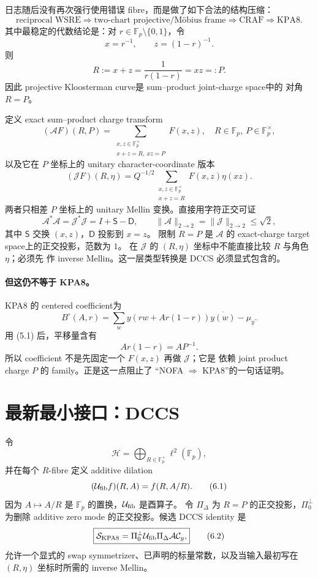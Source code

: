 \documentclass[11pt,a4paper]{ctexart}
\theoremstyle{definition}
\newcommand{\F}{\mathbb F}
\newcommand{\G}{\F_p^\times}
\begin{document}
日志随后没有再次强行使用错误 fibre，而是做了如下合法的结构压缩：
\[
\text{reciprocal WSRE}
\Longrightarrow \text{two-chart projective/M\"obius frame}
\Longrightarrow \mathrm{CRAF}
\Longrightarrow \mathrm{KPA8}.
\]
其中最稳定的代数结论是：对 $r\in\F_p\setminus\{0,1\}$，令
\[
x=r^{-1},\qquad z=(1-r)^{-1}.
\]
则
\[
R:=x+z=\frac1{r(1-r)}=xz=:P.
\tag{5.1}
\]
因此 projective Kloosterman curve是 sum--product joint-charge space中的
对角 $R=P$。

定义 exact sum--product charge transform
\[
(\mathcal AF)(R,P)
=\sum_{\substack{x,z\in\G\\x+z=R,\ xz=P}}F(x,z),
\quad R\in\F_p,\ P\in\G,
\tag{5.2}
\]
以及它在 $P$ 坐标上的 unitary character-coordinate 版本
\[
(\mathcal JF)(R,\eta)
=Q^{-1/2}\sum_{\substack{x,z\in\G\\x+z=R}}
F(x,z)\eta(xz).
\tag{5.3}
\]
两者只相差 $P$ 坐标上的 unitary Mellin 变换。直接用字符正交可证
\[
\boxed{\mathcal A^*\mathcal A
=\mathcal J^*\mathcal J=I+\mathsf S-\mathsf D},
\qquad \|\mathcal A\|_{2\to2}=\|\mathcal J\|_{2\to2}\le\sqrt2,
\tag{5.4}
\]
其中 $\mathsf S$ 交换 $(x,z)$，$\mathsf D$ 投影到 $x=z$。
限制 $R=P$ 是 $\mathcal A$ 的 exact-charge target space上的正交投影，范数为 $1$。
在 $\mathcal J$ 的 $(R,\eta)$ 坐标中不能直接比较 $R$ 与角色 $\eta$；必须先
作 inverse Mellin。这一层类型转换是 DCCS 必须显式包含的。

\paragraph{但这仍不等于 KPA8。}
KPA8 的 centered coefficient为
\[
B^\circ(A,r)
=\sum_w y(rw+Ar(1-r))\overline{y(w)}-\mu_y.
\tag{5.5}
\]
用 (5.1) 后，平移量含有
\[
Ar(1-r)=AP^{-1}.
\tag{5.6}
\]
所以 coefficient 不是先固定一个 $F(x,z)$ 再做 $\mathcal J$；它是
依赖 joint product charge $P$ 的 family。正是这一点阻止了
“NOFA $\Rightarrow$ KPA8”的一句话证明。

\section{最新最小接口：DCCS}

令
\[
\mathscr H=\bigoplus_{R\in\G}\ell^2(\F_p),
\]
并在每个 $R$-fibre 定义 additive dilation
\[
(\mathcal U_{\rm fib}f)(R,A)=f(R,A/R).
\tag{6.1}
\]
因为 $A\mapsto A/R$ 是 $\F_p$ 的置换，$\mathcal U_{\rm fib}$ 是酉算子。
令 $\Pi_\Delta$ 为 $R=P$ 的正交投影，$\Pi_0^\perp$ 为删除 additive
zero mode 的正交投影。候选 DCCS identity 是
\[
\boxed{
\mathcal S_{\rm KPA8}
=\Pi_0^\perp\mathcal U_{\rm fib}\Pi_\Delta
\mathcal A\mathcal C_y,}
\tag{6.2}
\]
允许一个显式的 swap symmetrizer、已声明的标量常数，以及当输入最初写在
$(R,\eta)$ 坐标时所需的 inverse Mellin。
\end{document}
